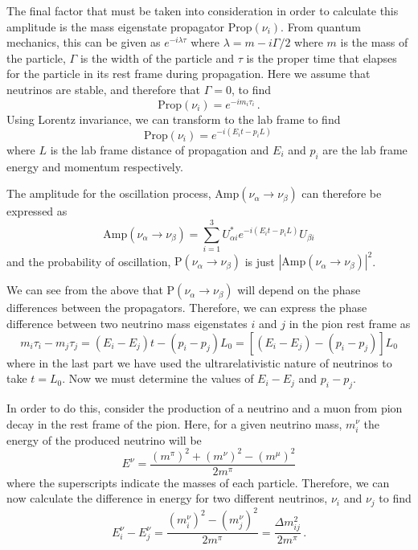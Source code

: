 The final factor that must be taken into consideration in order to calculate this amplitude is the mass eigenstate propagator $\text{Prop}(\nu_{i})$.
From quantum mechanics, this can be given as $e^{-i \lambda \tau}$ where $\lambda = m - i \Gamma /2$ where $m$ is the mass of the particle, $\Gamma$ is the width of the particle and $\tau$ is the proper time that elapses for the particle in its rest frame during propagation. 
Here we assume that neutrinos are stable, and therefore that $\Gamma = 0$, to find
\begin{equation}
  \text{Prop}(\nu_{i}) = e^{-i m_{i} \tau_{i}} \, .
\end{equation}
Using Lorentz invariance, we can transform to the lab frame to find
\begin{equation}
  \text{Prop}(\nu_{i}) = e^{-i (E_{i}t - p_{i}L) } \, 
\end{equation}
where $L$ is the lab frame distance of propagation and $E_{i}$ and $p_{i}$ are the lab frame energy and momentum respectively.

The amplitude for the oscillation process, $\text{Amp}(\nu_{\alpha} \rightarrow \nu_{\beta})$ can therefore be expressed as
\begin{equation}
  \text{Amp}(\nu_{\alpha} \rightarrow \nu_{\beta}) = \sum_{i=1}^{3} U^{*}_{\alpha i} e^{-i (E_{i}t - p_{i}L) } U_{\beta i}
  \label{eq:oscAmp}
\end{equation}
and the probability of oscillation, $\text{P}(\nu_{\alpha} \rightarrow \nu_{\beta})$ is just $|\text{Amp}(\nu_{\alpha} \rightarrow \nu_{\beta})|^{2}$.

We can see from the above that $\text{P}(\nu_{\alpha} \rightarrow \nu_{\beta})$ will depend on the phase differences between the propagators.
Therefore, we can express the phase difference between two neutrino mass eigenstates $i$ and $j$ in the pion rest frame as
\begin{equation}
  m_{i}\tau_{i} - m_{j}\tau_{j} = \left( E_{i} - E_{j} \right)t - \left( p_{i} - p_{j} \right) L_{0}  =  \left[ \left( E_{i} - E_{j} \right) - \left( p_{i} - p_{j} \right) \right]L_{0}
  \label{eq:phaseDiff}
\end{equation}
where in the last part we have used the ultrarelativistic nature of neutrinos to take $t=L_{0}$.
Now we must determine the values of $E_{i} - E_{j}$ and $p_{i} - p_{j}$.

In order to do this, consider the production of a neutrino and a muon from pion decay in the rest frame of the pion.
Here, for a given neutrino mass, $m_{i}^{\nu}$ the energy of the produced neutrino will be
\begin{equation}
  E^{\nu} = \frac{ (m^{\pi})^{2} + (m^{\nu})^{2} - (m^{\mu})^{2} }{ 2m^{\pi} }
\end{equation}
where the superscripts indicate the masses of each particle.
Therefore, we can now calculate the difference in energy for two different neutrinos, $\nu_{i}$ and $\nu_{j}$ to find
\begin{equation}
  E^{\nu}_{i} - E^{\nu}_{j} = \frac{ \left(m_{i}^{\nu}\right)^{2} - \left(m_{j}^{\nu}\right)^{2} }{ 2m^{\pi} } = \frac{\Delta m_{ij}^{2}}{2m^{\pi}} \, .
  \label{eq:nuDeltaE}
\end{equation}

